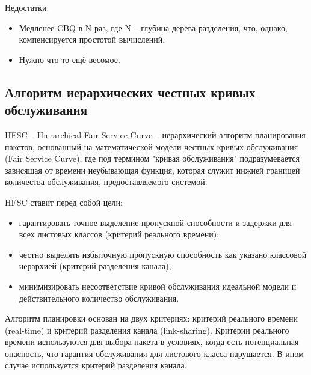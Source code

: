         Недостатки.
        \begin{itemize}
            \item Медленее CBQ в N раз, где N -- глубина дерева разделения, что, однако, компенсируется простотой вычислений.\cite{htb}
			\item Нужно что-то ещё весомое.
        \end{itemize}

    \subsection{Алгоритм иерархических честных кривых обслуживания}

        HFSC -- Hierarchical Fair-Service Curve -- иерархический алгоритм планирования пакетов,
        основанный на математической модели честных кривых обслуживания (Fair Service Curve),
        где под термином "кривая обслуживания" подразумевается зависящая от времени
        неубывающая функция, которая служит нижней границей количества обслуживания,
        предоставляемого системой.\cite{hfsc}

        HFSC ставит перед собой цели:
        \begin{itemize}
            \item гарантировать точное выделение пропускной способности и задержки для всех листовых классов (критерий реального времени);
            \item честно выделять избыточную пропускную способность как указано классовой иерархией (критерий разделения канала);
            \item минимизировать несоответствие кривой обслуживания идеальной модели и действительного количество обслуживания.\cite{tchfsc}
        \end{itemize}

        Алгоритм планировки основан на двух критериях: критерий реального времени
        (real-time) и критерий разделения канала (link-sharing). Критерии реального времени
        используются для выбора пакета в условиях, когда есть потенциальная опасность,
        что гарантия обслуживания для листового класса нарушается. В ином случае
        используется критерий разделения канала.\cite{tchfsc}

